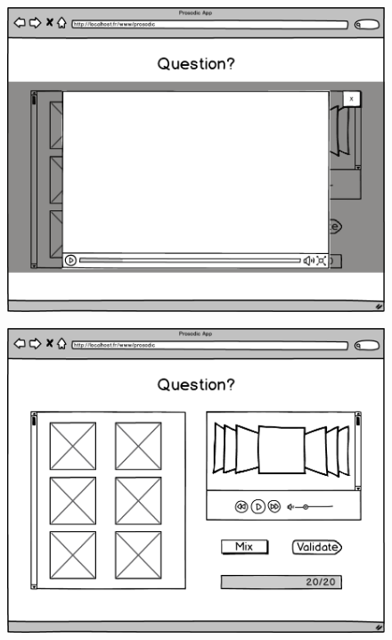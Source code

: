 \documentclass[a4paper,twoside,10pt]{report}
\begin{document}
 \begin{figure}[ht]
  \includegraphics[width=\textwidth]{T-2.png}
 \end{figure}
 
 \begin{figure}[ht]
  \includegraphics[width=\textwidth]{T-3.png}
 \end{figure}
 
\end{document}
